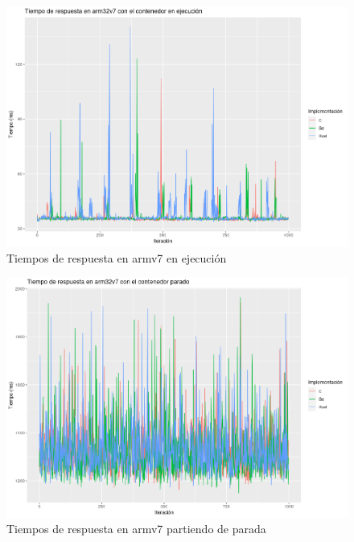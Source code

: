 \begin{figure}
    \centering
    \includegraphics[width=\textwidth]{images/response-time/arm-running.png}
    \caption{Tiempos de respuesta en armv7 en ejecución}
    \label{fig:response-time-arm-running}
\end{figure}

\begin{figure}
    \centering
    \includegraphics[width=\textwidth]{images/response-time/arm-stopped.png}
    \caption{Tiempos de respuesta en armv7 partiendo de parada}
    \label{fig:response-time-arm-stopped}
\end{figure}

